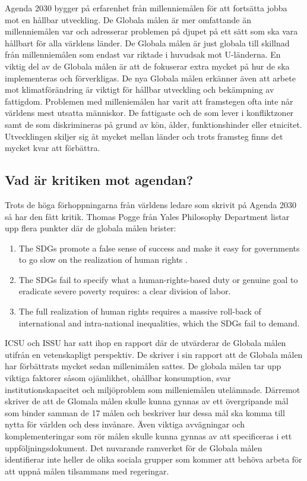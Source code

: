 \documentclass{report}
\begin{document}
Agenda 2030 bygger på erfarenhet från millenniemålen för att fortsätta jobba mot en hållbar utveckling. \cite{webEuropeanComission}
De Globala målen är mer omfattande än millenniemålen var och adresserar problemen på djupet på ett sätt som ska vara hållbart för alla världens länder. De Globala målen är just globala till skillnad från millenniemålen som endast var riktade i huvudsak mot U-länderna. En viktig del av de Globala målen är att de fokuserar extra mycket på hur de ska implementeras och förverkligas. De nya Globala målen erkänner även att arbete mot klimatförändring är viktigt för hållbar utveckling och bekämpning av fattigdom. \cite{web2030agenda}
Problemen med milleniemålen har varit att framstegen ofta inte når världens mest utsatta människor. De fattigaste och de som lever i konfliktzoner samt de som diskrimineras på grund av kön, ålder, funktionshinder eller etnicitet. Utvecklingen skiljer sig åt mycket mellan länder och trots framsteg finns det  mycket kvar att förbättra. \\

\subsection{Vad är kritiken mot agendan?} 
Trots de höga förhoppningarna från världens ledare som skrivit på Agenda 2030 så har den fått kritik. Thomas Pogge \cite{critique} från Yales Philosophy Department listar upp flera punkter där de globala målen brister: 

\begin{enumerate}
\item The SDGs promote a false sense of success and make it easy for governments to go slow on the realization of human rights .
\item The SDGs fail to specify what a human-rights-based duty or genuine goal to eradicate severe poverty requires: a clear division of labor.
\item The full realization of human rights requires a massive roll-back of international and intra-national inequalities, which the SDGs fail to demand.
\end{enumerate} 

ICSU och ISSU har satt ihop en rapport där de utvärderar de Globala målen utifrån en vetenskapligt perspektiv. De skriver i sin rapport att de Globala målen har förbättrats mycket sedan millenimålen sattes. De globala målen tar upp viktiga faktorer såsom ojämlikhet, ohållbar konsumption, svar institutionskapacitet och miljöproblem som milleniemålen utelämnade. Därremot skriver de att de Glomala målen skulle kunna gynnas av ett övergripande mål som binder samman de 17 målen och beskriver hur dessa mål ska komma till nytta för världen och dess invånare. Även viktiga avvägningar och komplementeringar som rör målen skulle kunna gynnas av att specificeras i ett uppföljningsdokument. Det nuvarande ramverket för de Globala målen identifierar inte heller de olika sociala grupper som kommer att behöva arbeta för att uppnå målen tilsammans med regeringar. 
\end{document}
